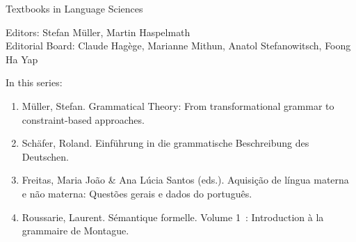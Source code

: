 {\large Textbooks in Language Sciences}

\bigskip

Editors: Stefan Müller, Martin Haspelmath  \\
Editorial Board: Claude Hagège, Marianne Mithun, Anatol Stefanowitsch, Foong Ha Yap

\bigskip

In this series:

\begin{enumerate}
\item Müller, Stefan. Grammatical Theory: From transformational grammar to constraint-based approaches.
\item Schäfer, Roland. Einführung in die grammatische Beschreibung des Deutschen.
\item Freitas, Maria João \& Ana Lúcia Santos (eds.). Aquisição de língua materna e não materna: Questões gerais e dados do português.
\item Roussarie, Laurent. Sémantique formelle. Volume 1~: Introduction à la grammaire de Montague.
\end{enumerate}



